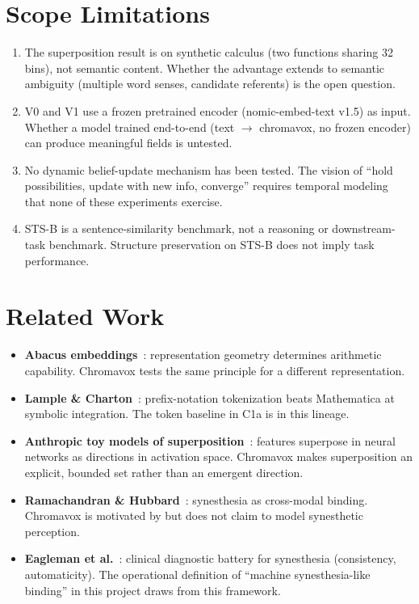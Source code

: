 \documentclass[11pt,a4paper]{article}
\begin{document}
\section{Scope Limitations}

\begin{enumerate}
\item The superposition result is on synthetic calculus (two functions sharing 32 bins), not semantic content. Whether the advantage extends to semantic ambiguity (multiple word senses, candidate referents) is the open question.
\item V0 and V1 use a frozen pretrained encoder (nomic-embed-text v1.5) as input. Whether a model trained end-to-end (text $\to$ chromavox, no frozen encoder) can produce meaningful fields is untested.
\item No dynamic belief-update mechanism has been tested. The vision of ``hold possibilities, update with new info, converge'' requires temporal modeling that none of these experiments exercise.
\item STS-B is a sentence-similarity benchmark, not a reasoning or downstream-task benchmark. Structure preservation on STS-B does not imply task performance.
\end{enumerate}

\section{Related Work}

\begin{itemize}
\item \textbf{Abacus embeddings}~\cite{abacus}: representation geometry determines arithmetic capability. Chromavox tests the same principle for a different representation.
\item \textbf{Lample \& Charton}~\cite{lample2020}: prefix-notation tokenization beats Mathematica at symbolic integration. The token baseline in C1a is in this lineage.
\item \textbf{Anthropic toy models of superposition}~\cite{toy}: features superpose in neural networks as directions in activation space. Chromavox makes superposition an explicit, bounded set rather than an emergent direction.
\item \textbf{Ramachandran \& Hubbard}~\cite{ramachandran}: synesthesia as cross-modal binding. Chromavox is motivated by but does not claim to model synesthetic perception.
\item \textbf{Eagleman et al.}~\cite{eagleman}: clinical diagnostic battery for synesthesia (consistency, automaticity). The operational definition of ``machine synesthesia-like binding'' in this project draws from this framework.
\end{itemize}
\end{document}
